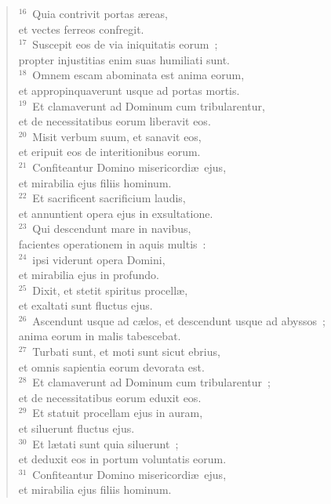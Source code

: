 \begin{flushleft}
\begin{verse}
${}^{16}$~Quia contrivit portas \ae reas,\\ et vectes ferreos confregit.\\
${}^{17}$~Suscepit eos de via iniquitatis eorum~;\\ propter injustitias enim suas humiliati sunt.\\
${}^{18}$~Omnem escam abominata est anima eorum,\\ et appropinquaverunt usque ad portas mortis.\\
${}^{19}$~Et clamaverunt ad Dominum cum tribularentur,\\ et de necessitatibus eorum liberavit eos.\\
${}^{20}$~Misit verbum suum, et sanavit eos,\\ et eripuit eos de interitionibus eorum.\\
${}^{21}$~Confiteantur Domino misericordi\ae\ ejus,\\ et mirabilia ejus filiis hominum.\\
${}^{22}$~Et sacrificent sacrificium laudis,\\ et annuntient opera ejus in exsultatione.\\
${}^{23}$~Qui descendunt mare in navibus,\\ facientes operationem in aquis multis~:\\
${}^{24}$~ipsi viderunt opera Domini,\\ et mirabilia ejus in profundo.\\
${}^{25}$~Dixit, et stetit spiritus procell\ae ,\\ et exaltati sunt fluctus ejus.\\
${}^{26}$~Ascendunt usque ad c\ae los, et descendunt usque ad abyssos~;\\ anima eorum in malis tabescebat.\\
${}^{27}$~Turbati sunt, et moti sunt sicut ebrius,\\ et omnis sapientia eorum devorata est.\\
${}^{28}$~Et clamaverunt ad Dominum cum tribularentur~;\\ et de necessitatibus eorum eduxit eos.\\
${}^{29}$~Et statuit procellam ejus in auram,\\ et siluerunt fluctus ejus.\\
${}^{30}$~Et l\ae tati sunt quia siluerunt~;\\ et deduxit eos in portum voluntatis eorum.\\
${}^{31}$~Confiteantur Domino misericordi\ae\ ejus,\\ et mirabilia ejus filiis hominum.\\

\end{verse}
\end{flushleft}

